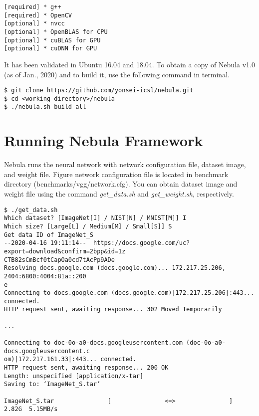 \documentclass[10pt]{article}
\begin{document}
\begin{Verbatim}[frame=single,fontsize=\small]
[required] * g++
[required] * OpenCV
[optional] * nvcc
[optional] * OpenBLAS for CPU
[optional] * cuBLAS for GPU 
[optional] * cuDNN for GPU
\end{Verbatim}

It has been validated in Ubuntu 16.04 and 18.04.
To obtain a copy of Nebula v1.0 (as of Jan., 2020) and to build it, use the following command in terminal.

\begin{Verbatim}[frame=single,fontsize=\small]
$ git clone https://github.com/yonsei-icsl/nebula.git
$ cd <working directory>/nebula
$ ./nebula.sh build all
\end{Verbatim}

\section{Running Nebula Framework} \label{sec:running}

Nebula runs the neural network with network configuration file, dataset image, and weight file.
Figure network configuration file is located in benchmark directory (benchmarks/vgg/network.cfg).
You can obtain dataset image and weight file using the command \emph{get\_data.sh} and \emph{get\_weight.sh}, respectively.

\begin{Verbatim}[frame=single,fontsize=\small]
$ ./get_data.sh
Which dataset? [ImageNet[I] / NIST[N] / MNIST[M]] I
Which size? [Large[L] / Medium[M] / Small[S]] S
Get data ID of ImageNet_S
--2020-04-16 19:11:14--  https://docs.google.com/uc?export=download&confirm=2bpp&id=1z
CTB82sCmBcf0tCapOa0cd7tAcPp9ADe
Resolving docs.google.com (docs.google.com)... 172.217.25.206, 2404:6800:4004:81a::200
e
Connecting to docs.google.com (docs.google.com)|172.217.25.206|:443... connected.
HTTP request sent, awaiting response... 302 Moved Temporarily

...

Connecting to doc-0o-a0-docs.googleusercontent.com (doc-0o-a0-docs.googleusercontent.c
om)|172.217.161.33|:443... connected.
HTTP request sent, awaiting response... 200 OK
Length: unspecified [application/x-tar]
Saving to: ‘ImageNet_S.tar’

ImageNet_S.tar               [               <=>               ]   2.82G  5.15MB/s  

\end{Verbatim}
\end{document}
